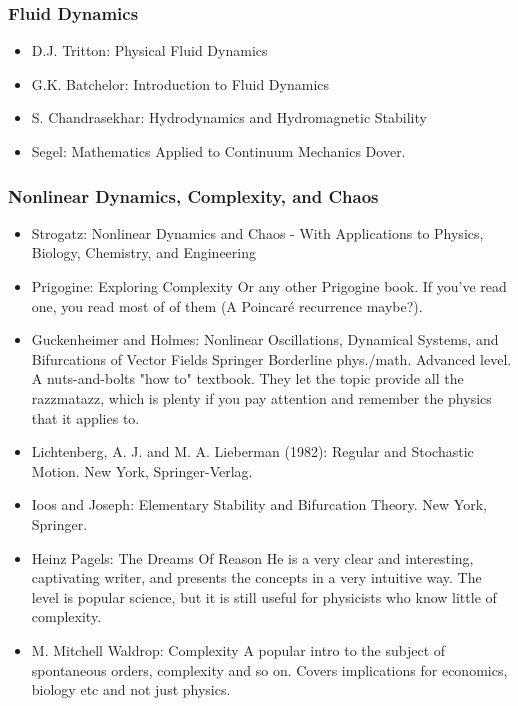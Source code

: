 \documentclass[10pt,a4paper]{book}
\theoremstyle{definition}
\begin{document}
\subsubsection{Fluid Dynamics}
\begin{itemize}
\item D.J. Tritton: Physical Fluid Dynamics
\item G.K. Batchelor: Introduction to Fluid Dynamics
\item S. Chandrasekhar: Hydrodynamics and Hydromagnetic Stability
\item Segel: Mathematics Applied to Continuum Mechanics Dover.
\end{itemize}


\subsubsection{Nonlinear Dynamics, Complexity, and Chaos}

\begin{itemize}
\item Strogatz: Nonlinear Dynamics and Chaos - With Applications to Physics, Biology, Chemistry, and Engineering
\item Prigogine: Exploring Complexity
Or any other Prigogine book.  If you've read one, you read most of of them (A Poincaré recurrence maybe?).
\item Guckenheimer and Holmes: Nonlinear Oscillations, Dynamical Systems, and Bifurcations of Vector Fields Springer
Borderline phys./math.  Advanced level.  A nuts-and-bolts "how to" textbook.  They let the topic provide all the razzmatazz, which is plenty if you pay attention and remember the physics that it applies to.
\item Lichtenberg, A. J. and M. A. Lieberman (1982): Regular and Stochastic Motion.  New York, Springer-Verlag.
\item Ioos and Joseph: Elementary Stability and Bifurcation Theory.  New York, Springer.
\item Heinz Pagels: The Dreams Of Reason
He is a very clear and interesting, captivating writer, and presents the concepts in a very intuitive way.  The level is popular science, but it is still useful for physicists who know little of complexity.
\item M. Mitchell Waldrop: Complexity
A popular intro to the subject of spontaneous orders, complexity and so on.  Covers implications for economics, biology etc and not just physics.
\end{itemize}
\end{document}
